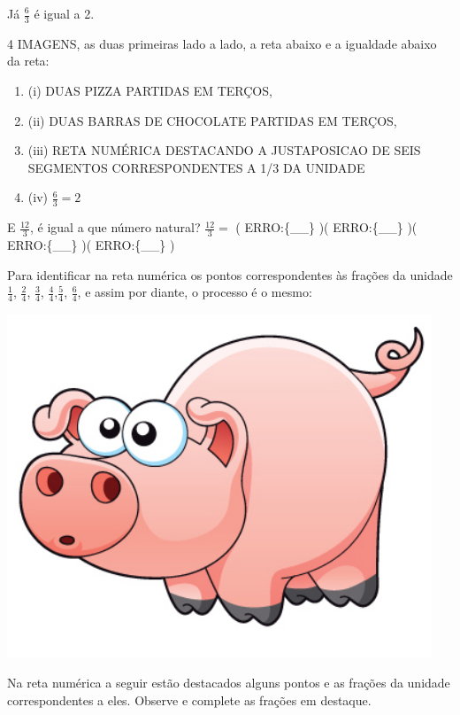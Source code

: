 \documentclass[a4,12pt]{book}
\begin{document}
Já $\frac{6}{3}$ é igual a 2.

\begin{imagem*}[breakable]{}{}   4 IMAGENS, as duas primeiras lado a lado, a reta abaixo e a igualdade abaixo da reta:
\begin{enumerate} [\quad a)] %
    \item       (i) DUAS PIZZA PARTIDAS EM TERÇOS,
    \item       (ii) DUAS BARRAS DE CHOCOLATE PARTIDAS EM TERÇOS,
    \item       (iii) RETA NUMÉRICA DESTACANDO A JUSTAPOSICAO DE SEIS SEGMENTOS CORRESPONDENTES A 1/3 DA UNIDADE
    \item       (iv)       $\frac{6}{3}=2$
\end{enumerate} %

\end{imagem*}

E $\frac{12}{3}$, é igual a que número natural? $\frac{12}{3}=$ ( ERRO:\{\_\_\} )( ERRO:\{\_\_\} )( ERRO:\{\_\_\} )( ERRO:\{\_\_\} ) \mbox{} \newline

Para identificar na reta numérica os pontos correspondentes às frações da unidade $\frac{1}{4}$, $\frac{2}{4}$, $\frac{3}{4}$, $\frac{4}{4}$,$\frac{5}{4}$, $\frac{6}{4}$, e assim por diante, o processo é o mesmo:

\begin{imagem*}[breakable]{}{}       \includegraphics[width=360pt, keepaspectratio]{pig}   \end{imagem*}

Na reta numérica a seguir estão destacados alguns pontos e as frações da unidade correspondentes a eles. Observe e complete as frações em destaque.
\end{document}
